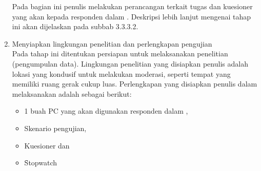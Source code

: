 \begin{enumerate}[label=\alph*.]
	Pada bagian ini penulis melakukan perancangan terkait tugas dan kuesioner yang akan kepada responden dalam \ust. Deskripsi lebih lanjut mengenai tahap ini akan dijelaskan pada subbab 3.3.3.2.
	\item Menyiapkan lingkungan penelitian dan perlengkapan pengujian\\
	Pada tahap ini ditentukan persiapan untuk melaksanakan penelitian (pengumpulan data). Lingkungan penelitian yang disiapkan penulis adalah lokasi yang kondusif untuk melakukan moderasi, seperti tempat yang memiliki ruang gerak cukup luas. Perlengkapan yang disiapkan penulis dalam melaksanakan \ust \space adalah sebagai berikut:
	\begin{itemize}
		\item 1 buah PC yang akan digunakan responden dalam \ust,
		\item Skenario pengujian,
		\item Kuesioner dan
		\item \f{Stopwatch}
	\end{itemize}
\end{enumerate}
